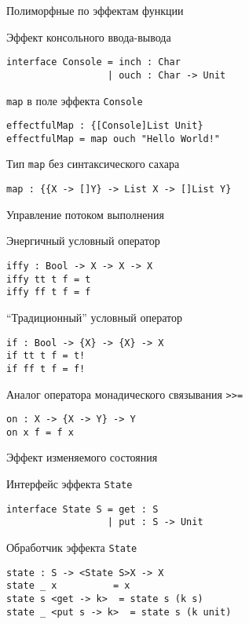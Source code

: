 \begin{frame}[fragile]{Полиморфные по эффектам функции}
\begin{block}{Эффект консольного ввода-вывода}
\begin{verbatim}
interface Console = inch : Char
                  | ouch : Char -> Unit
\end{verbatim}
\end{block}
\pause
\begin{block}{\texttt{map} в поле эффекта \texttt{Console}}
\begin{verbatim}
effectfulMap : {[Console]List Unit}
effectfulMap = map ouch "Hello World!"
\end{verbatim}
\end{block}
\pause
\begin{block}{Тип \texttt{map} без синтаксического сахара}
\begin{verbatim}
map : {{X -> []Y} -> List X -> []List Y}
\end{verbatim}
\end{block}
\end{frame}



\begin{frame}[fragile]{Управление потоком выполнения}
\begin{block}{Энергичный условный оператор}
\begin{verbatim}
iffy : Bool -> X -> X -> X
iffy tt t f = t
iffy ff t f = f
\end{verbatim}
\end{block}
\pause
\begin{block}{``Традиционный'' условный оператор}
\begin{verbatim}
if : Bool -> {X} -> {X} -> X
if tt t f = t!
if ff t f = f!
\end{verbatim}
\end{block}
\pause
\begin{block}{Аналог оператора монадического связывания \texttt{>>=}}
\begin{verbatim}
on : X -> {X -> Y} -> Y
on x f = f x
\end{verbatim}
\end{block}

\end{frame}

\begin{frame}[fragile]{Эффект изменяемого состояния}
\begin{block}{Интерфейс эффекта \texttt{State}}
\begin{verbatim}
interface State S = get : S
                  | put : S -> Unit
\end{verbatim}
\end{block}
\pause
\begin{block}{Обработчик эффекта \texttt{State}}
\begin{verbatim}
state : S -> <State S>X -> X
state _ x          = x
state s <get -> k>  = state s (k s)
state _ <put s -> k>  = state s (k unit)
\end{verbatim}
\end{block}
\end{frame}

